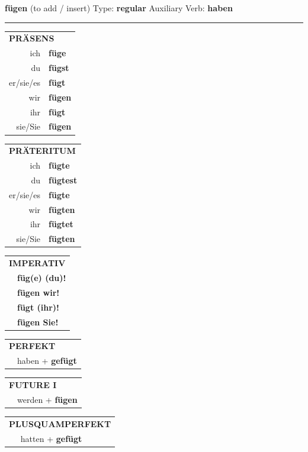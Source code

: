 \documentclass[10pt,a4paper]{revtex4-2}
\begin{document}
\begin{verbbox}
{\Large \bf fügen} (to add / insert) \hfill Type: \textbf{regular} \hfill Auxiliary Verb: \textbf{haben}

\vspace{5pt}
\hrule
\vspace{5pt}

\begin{tabular}{rl}
\multicolumn{2}{l}{\textbf{PRÄSENS}}\\
ich & \textbf{füge}\\
du & \textbf{fügst}\\
er/sie/es & \textbf{fügt}\\
wir & \textbf{fügen}\\
ihr & \textbf{fügt}\\
sie/Sie & \textbf{fügen}\\
\end{tabular}
\hfill
\begin{tabular}{rl}
\multicolumn{2}{l}{\textbf{PRÄTERITUM}}\\
ich & \textbf{fügte}\\
du & \textbf{fügtest}\\
er/sie/es & \textbf{fügte}\\
wir & \textbf{fügten}\\
ihr & \textbf{fügtet}\\
sie/Sie & \textbf{fügten}\\
\end{tabular}
\hfill
\begin{tabular}{rl}
\multicolumn{2}{l}{\textbf{IMPERATIV}}\\
& \textbf{füg(e) (du)!}\\
& \textbf{fügen wir!}\\
& \textbf{fügt (ihr)!}\\
& \textbf{fügen Sie!}\\
\end{tabular}

\vspace{10pt}

\begin{tabular}{rl}
\multicolumn{2}{l}{\textbf{PERFEKT}}\\
& haben + \textbf{gefügt}\\
\end{tabular}
\hfill
\begin{tabular}{rl}
\multicolumn{2}{l}{\textbf{FUTURE I}}\\
& werden + \textbf{fügen}\\
\end{tabular}
\hfill
\begin{tabular}{rl}
\multicolumn{2}{l}{\textbf{PLUSQUAMPERFEKT}}\\
& hatten + \textbf{gefügt}\\
\end{tabular}


\end{verbbox}
\end{document}
